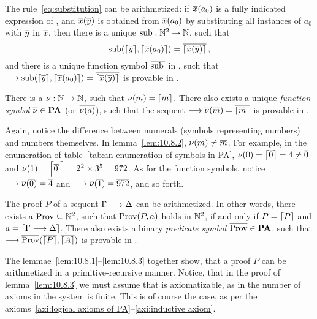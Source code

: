 \documentclass[11pt,a4paper]{article}
\begin{document}
\begin{lemma}[10.8.1]\label{lem:10.8.1}
    The rule~\eqref{eq:substitution} can be arithmetized:
    if \(\num x(a_0)\) is a fully indicated expression of \PA,
    and \(\num x(\num y)\) is obtained from \(\num x(a_0)\)
    by substituting all instances of \(a_0\) with \(\num y\)
    in \(\num x\), then there is a unique \PRF{} \(\sub: \Nset^2\to\Nset\),
    such that
    \begin{equation*}
        \sub\arcs*{\G{\num y}, \G{\num x(a_0)}} = \num{\G{\num x(\num y)}}\,,
    \end{equation*}
    and there is a unique function symbol \(\num{\sub{}}\) in \PA{},
    such that \(\seq\sub\arcs*{\G*{\num y}, \G*{\num x(a_0)}} = \num{\G*{\num x(\num y)}}\)
    is provable in \PA{}.
\end{lemma}
\begin{lemma}[10.8.2]\label{lem:10.8.2}
    There is a \PRF{} \(\nu:\Nset\to\Nset\),
    such that \(\nu(m)=\G*{\num m}\). There also exists
    a unique \emph{function symbol} \(\num\nu\in\PA\) (or \(\num{\nu(a)}\)),
    such that the sequent \(\seq\num\nu(\num m) = \num{\G*{\num m}}\)
    is provable in \PA{}.
\end{lemma}

Again, notice the difference between numerals (symbols representing numbers)
and numbers themselves. In lemma~\ref{lem:10.8.2}, \(\nu(m)\neq\num m\).
For example, in the enumeration of table~\ref{tab:an enumeration of symbols in PA},
\(\nu(0) = \G*{\num0} = 4 \neq \num0\) and \(\nu(1) = \G*{\num0'} = 2^2\times3^5 = 972\).
As for the function symbols, notice \(\seq\num\nu(\num0) = \num4\)
and \(\seq\num\nu(\num1) = \num{972}\), and so forth.

\begin{lemma}[10.8.3]\label{lem:10.8.3}
    The proof \(P\) of a sequent \(\Gamma\seq\Delta\)
    can be arithmetized. In other words, there exists a \PRR{}
    \(\Prov\subseteq\Nset^2\), such that \(\Prov(P,a)\) holds
    in \(\Nset^2\), if and only if \(P = \G P\) and \(a = \G{\Gamma\seq\Delta}\).
    There also exists a binary \emph{predicate symbol} \(\num\Prov\in\PA\),
    such that \(\seq\num\Prov(\num{\G P}, \num{\G A})\) is provable in \PA.
\end{lemma}

The lemmae~\ref{lem:10.8.1}--\ref{lem:10.8.3} together show,
that a proof \(P\) can be arithmetized in a pri\-mi\-tive-re\-cur\-sive
manner. Notice, that in the proof of lemma~\ref{lem:10.8.3}
we must assume that \PA{} is axiomatizable, as in the number
of axioms in the system is finite. This is of course the case,
as per the axioms~\ref{axi:logical axioms of PA}--\ref{axi:inductive axiom}.
\end{document}

